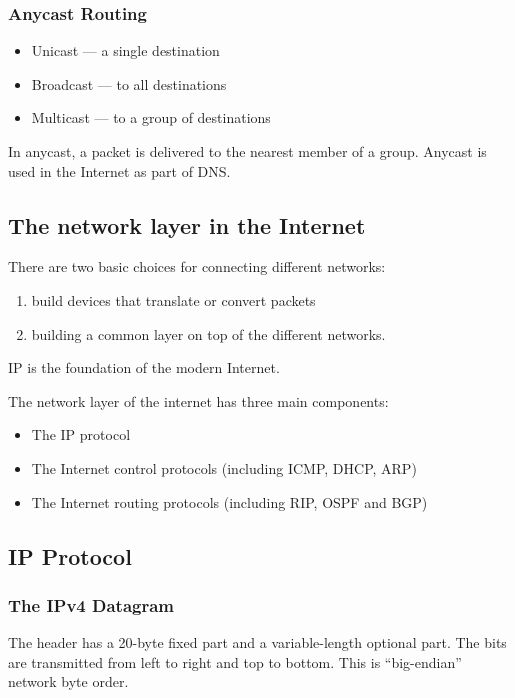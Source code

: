 \subsubsection{Anycast Routing}
\begin{itemize}
    \item Unicast --- a single destination
    \item Broadcast --- to all destinations
    \item Multicast --- to a group of destinations
\end{itemize}
In anycast, a packet is delivered to the nearest member of a group. Anycast is used in the Internet as part of DNS. 


\subsection{The network layer in the Internet}
There are two basic choices for connecting different networks:
\begin{enumerate}
    \item build devices that translate or convert packets
    \item building a common layer on top of the different networks.
\end{enumerate}
IP is the foundation of the modern Internet. 

The network layer of the internet has three main components:
\begin{itemize}\small
    \item The IP protocol
    \item The Internet control protocols (including ICMP, DHCP, ARP)
    \item The Internet routing protocols (including RIP, OSPF and BGP)
\end{itemize}

\subsection{IP Protocol}
\subsubsection{The IPv4 Datagram}
The header has a 20-byte fixed part and a variable-length optional part. The bits are transmitted from left to right and top to bottom. This is ``big-endian'' network byte order.

